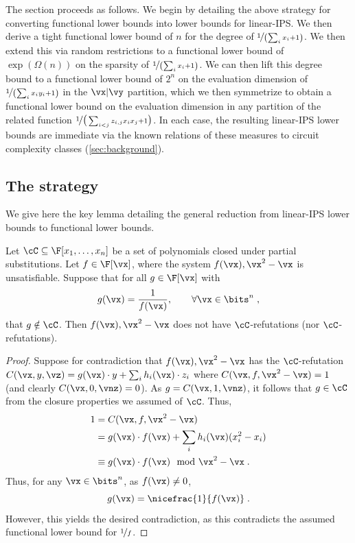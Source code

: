\documentclass{toc}
\begin{document}
The section proceeds as follows.  We begin by detailing the above strategy for converting functional lower bounds into lower bounds for linear-IPS\@. We then derive a tight functional lower bound of $n$ for the degree of $\nicefrac{1}{\left(\sum_i x_i+1\right)}$. We then extend this via random restrictions to a functional lower bound of $\exp(\Omega(n))$ on the sparsity of $\nicefrac{1}{\left(\sum_i x_i+1\right)}$.  We can then lift this degree bound to a functional lower bound of $2^n$ on the evaluation dimension of $\nicefrac{1}{\left(\sum_i x_iy_i+1\right)}$ in the $\vx|\vy$ partition, which we then symmetrize to obtain a functional lower bound on the evaluation dimension in any partition of the related function $\nicefrac{1}{\big(\sum_{i<j} z_{i,j}x_ix_j+1\big)}$.  In each case, the resulting linear-IPS lower bounds are immediate via the known relations of these measures to circuit complexity classes (\autoref{sec:background}).

\subsection{The strategy}\label{sec:lbs-fn:strategy}

We give here the key lemma detailing the general reduction from linear-IPS lower bounds to functional lower bounds.

\begin{lemma}\label{res:lbs-fn_lbs-ips:lIPS}
        Let $\cC\subseteq\F[x_1,\ldots,x_n]$ be a set of polynomials closed under partial substitutions. Let $f\in\F[\vx]$, where the system $f(\vx),\vx^2-\vx$ is unsatisfiable.  Suppose that for all $g\in\F[\vx]$ with
        \[
                g(\vx)=\frac{1}{f(\vx)},\qquad \forall \vx\in\bits^n\;,
        \]
        that $g\notin \cC$.  Then $f(\vx),\vx^2-\vx$ does not have $\cC$-\lIPS refutations (nor  $\cC$-\lbIPS refutations).
\end{lemma}
\begin{proof}
        Suppose for contradiction that $f(\vx),\vx^2-\vx$ has the $\cC$-\lIPS refutation $C(\vx,y,\vz)=g(\vx)\cdot y+\sum_i h_i(\vx) \cdot z_i$ where $C(\vx,f,\vx^2-\vx)=1$ (and clearly $C(\vx,0,\vnz)=0$). As $g=C(\vx,1,\vnz)$, it follows that $g\in\cC$ from the closure properties we assumed of $\cC$. Thus,
        \begin{align*}
                1&=C(\vx,f,\vx^2-\vx)\\
                &=g(\vx)\cdot f(\vx)+\sum_i h_i(\vx) (x_i^2-x_i)\\
                &\equiv g(\vx)\cdot f(\vx)\mod\vx^2-\vx
                \;.
        \end{align*}
        Thus, for any $\vx\in\bits^n$, as $f(\vx)\ne 0$,
        \[
                g(\vx)=\nicefrac{1}{f(\vx)}
                \;.
        \]
        However, this yields the desired contradiction, as this contradicts the assumed functional lower bound for $\nicefrac{1}{f}$.
\end{proof}
\end{document}
